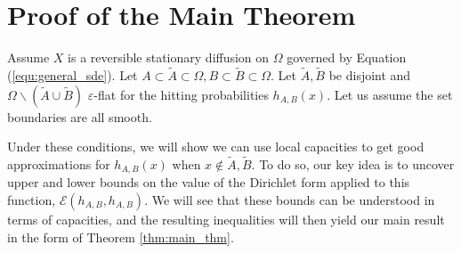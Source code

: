 \documentclass[english, aip, jcp, priprint, graphicx,floatfix]{revtex4-1}
\theoremstyle{plain}
\theoremstyle{definition}
\theoremstyle{plain}
\begin{document}
\section{Proof of the Main Theorem}\label{sec:proof_thm}

Assume $X$ is a reversible stationary diffusion on $\Omega$ governed by Equation (\ref{equ:general_sde}).  Let $A\subset\tilde A\subset\Omega,B\subset\tilde B\subset\Omega$.  Let $\tilde A,\tilde B$ be disjoint and $\Omega \backslash (\tilde A \cup \tilde B)$ $\varepsilon$-flat for the hitting probabilities $h_{A,B}(x)$.  Let us assume the set boundaries are all smooth.  

Under these conditions, we will show we can use local capacities to get good approximations for $h_{A,B}(x)$ when $x\notin \tilde A,\tilde B$.  To do so, our key idea is to uncover upper and lower bounds on the value of the Dirichlet form applied to this function, $\mathcal{E}(h_{A,B},h_{A,B})$.  We will see that these bounds can be understood in terms of capacities, and the resulting inequalities will then yield our main result in the form of Theorem \ref{thm:main_thm}.
\end{document}
